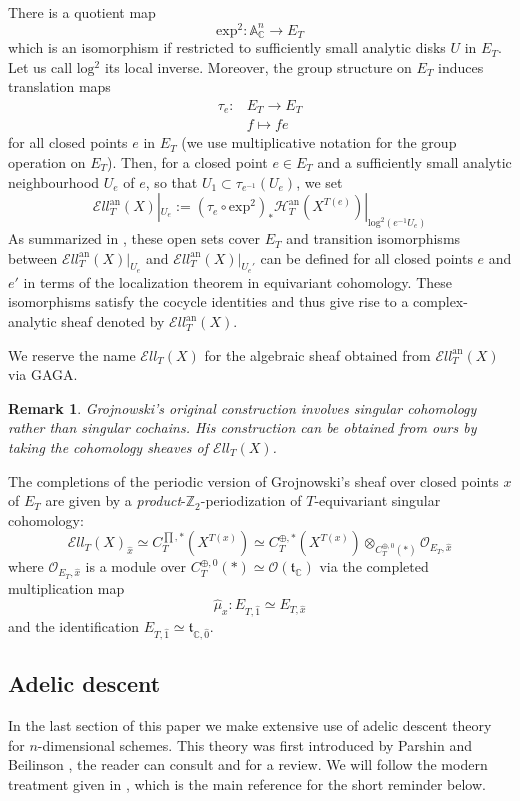 \documentclass[11pt,letterpaper]{amsart}
\newtheorem{remark}[dummy]{Remark}
\newcommand{\bA}{\mathbb{A}}
\newcommand{\bC}{\mathbb{C}}
\newcommand{\bZ}{\mathbb{Z}}
\newcommand{\cO}{\mathcal{O}}
\newcommand{\cH}{\mathcal{H}}
\newcommand{\ft}{\mathfrak{t}}
\newcommand{\El}{\mathcal{E}ll}
\newcommand{\an}{\mathrm{an}}
\begin{document}
There is a quotient map
$$\mathrm{exp^2}:\bA^n_\bC\to E_T$$
which is an isomorphism if restricted to sufficiently small analytic disks $U$ in $E_T$. Let us call $\mathrm{log^2}$ its local inverse. Moreover, the group structure on $E_T$ induces translation maps
\begin{align*}
\tau_e: & E_T\to E_T \\ & f\mapsto fe
\end{align*}
for all closed points $e$ in $E_T$ (we use multiplicative notation for the group operation on $E_T$).
Then, for a closed point $e\in E_T$ and a sufficiently small analytic neighbourhood $U_e$ of $e$, so that $U_1\subset \tau_{e^{-1}}(U_e)$, we set
$$\El_T^{\an}(X)|_{U_e}:=(\tau_e\circ\mathrm{exp^2})_{\ast}\cH_T^{\an}(X^{T(e)})|_{\mathrm{log^2}(e^{-1}U_e)}$$
As summarized in \cite{Gan14}, these open sets cover $E_T$ and transition isomorphisms between $\El_T^{\an}(X)|_{U_e}$ and $\El_T^{\an}(X)|_{U_e'}$ can be defined for all closed points $e$ and $e'$ in terms of the localization theorem in equivariant cohomology. These isomorphisms satisfy the cocycle identities and thus give rise to a complex-analytic sheaf denoted by $\El_T^{\an}(X)$.

We reserve the name $\El_T(X)$ for the algebraic sheaf obtained from $\El_T^{\an}(X)$ via GAGA.
\begin{remark}
Grojnowski's original construction involves singular cohomology rather than singular cochains. His construction can be obtained from ours by taking the cohomology sheaves of $\El_T(X)$.
\end{remark}

The completions of the periodic version of Grojnowski's sheaf over closed points $x$ of $E_T$ are given by a \emph{product}-$\bZ_2$-periodization of $T$-equivariant singular cohomology:
$$\El_T(X)_{\widehat{x}}\simeq C_{T}^{\prod,\ast}(X^{T(x)})\simeq C_{T}^{\oplus,\ast}(X^{T(x)})\otimes_{C_T^{\oplus,0}(\ast)}\cO_{E_T,\widehat{x}}$$
where $\cO_{E_T,\widehat{x}}$ is a module over $C_T^{\oplus,0}(\ast)\simeq\cO(\ft_\bC)$ via the completed multiplication map $$\widehat{\mu}_x:E_{T,\widehat{1}}\simeq E_{T,\widehat{x}}$$
and the identification $E_{T,\widehat{1}}\simeq \ft_{\bC,\widehat{0}}$.


\subsection{Adelic descent}
\label{sec:adelic}
In the last section of this paper we make extensive use of adelic descent theory for $n$-dimensional schemes. This theory was first introduced by Parshin \cite{ParAd} and Beilinson \cite{BeilAd}, the reader can consult \cite{HubAd} and \cite{MorAd} for a review. We will follow the modern treatment given in \cite{Groech}, which is  the main reference for the short reminder below. 
\end{document}
